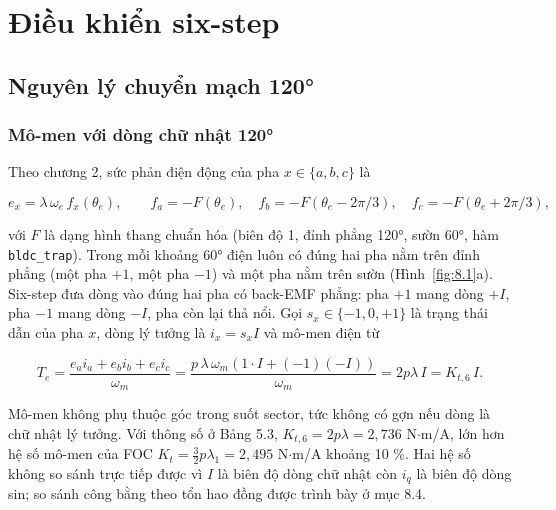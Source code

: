 
\section{Điều khiển six-step}\label{sec:8}

\subsection{Nguyên lý chuyển mạch 120°}\label{sec:8.1}

\subsubsection{Mô-men với dòng chữ nhật 120°}\label{sec:8.1.1}

Theo chương 2, sức phản điện động của pha $x \in \{a, b, c\}$ là

\begin{equation}
e_x = \lambda\,\omega_e\, f_x(\theta_e), \qquad f_a = -F(\theta_e),\quad f_b = -F(\theta_e - 2\pi/3),\quad f_c = -F(\theta_e + 2\pi/3),
\tag{8.1}\label{eq:8.1}
\end{equation}

với $F$ là dạng hình thang chuẩn hóa (biên độ 1, đỉnh phẳng 120°, sườn 60°, hàm \texttt{bldc\_trap}). Trong mỗi khoảng 60° điện luôn có đúng hai pha nằm trên đỉnh phẳng (một pha $+1$, một pha $-1$) và một pha nằm trên sườn (Hình~\ref{fig:8.1}a). Six-step đưa dòng vào đúng hai pha có back-EMF phẳng: pha $+1$ mang dòng $+I$, pha $-1$ mang dòng $-I$, pha còn lại thả nổi. Gọi $s_x \in \{-1, 0, +1\}$ là trạng thái dẫn của pha $x$, dòng lý tưởng là $i_x = s_x I$ và mô-men điện từ

\begin{equation}
T_e = \frac{e_a i_a + e_b i_b + e_c i_c}{\omega_m} = \frac{p\,\lambda\,\omega_m (1\cdot I + (-1)(-I))}{\omega_m} = 2p\lambda\, I = K_{t,6}\, I.
\tag{8.2}\label{eq:8.2}
\end{equation}

Mô-men không phụ thuộc góc trong suốt sector, tức không có gợn nếu dòng là chữ nhật lý tưởng. Với thông số ở Bảng 5.3, $K_{t,6} = 2p\lambda = 2{,}736$ N$\cdot$m/A, lớn hơn hệ số mô-men của FOC $K_t = \tfrac32 p\lambda_1 = 2{,}495$ N$\cdot$m/A khoảng 10 \%. Hai hệ số không so sánh trực tiếp được vì $I$ là biên độ dòng chữ nhật còn $i_q$ là biên độ dòng sin; so sánh công bằng theo tổn hao đồng được trình bày ở mục 8.4.

